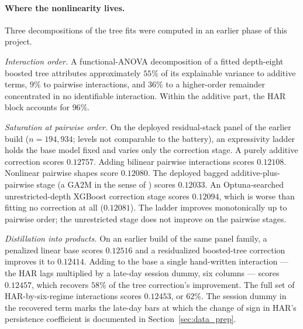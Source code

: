 
\paragraph{Where the nonlinearity lives.} Three decompositions of the tree
fits were computed in an earlier phase of this project.

\emph{Interaction order.} A functional-ANOVA decomposition of a fitted
depth-eight boosted tree attributes approximately $55\%$ of its explainable
variance to additive terms, $9\%$ to pairwise interactions, and $36\%$ to a
higher-order remainder concentrated in no identifiable interaction. Within
the additive part, the HAR block accounts for $96\%$.

\emph{Saturation at pairwise order.} On the deployed residual-stack panel
of the earlier build ($n = 194{,}934$; levels not comparable to the
battery), an expressivity ladder holds the base model fixed and varies only
the correction stage. A purely additive correction scores $0.12757$.
Adding bilinear pairwise interactions scores $0.12108$. Nonlinear pairwise
shapes score $0.12080$. The deployed bagged additive-plus-pairwise stage (a
GA2M in the sense of \citealt{Lou2013}) scores $0.12033$. An
Optuna-searched unrestricted-depth XGBoost correction stage scores
$0.12094$, which is worse than fitting no correction at all ($0.12081$).
The ladder improves monotonically up to pairwise order; the unrestricted
stage does not improve on the pairwise stages.

\emph{Distillation into products.} On an earlier build of the same panel
family, a penalized linear base scores $0.12516$ and a residualized
boosted-tree correction improves it to $0.12414$. Adding to the base a
single hand-written interaction --- the HAR lags multiplied by a late-day
session dummy, six columns --- scores $0.12457$, which recovers $58\%$ of
the tree correction's improvement. The full set of HAR-by-six-regime
interactions scores $0.12453$, or $62\%$. The session dummy in the
recovered term marks the late-day bars at which the change of sign in
HAR's persistence coefficient is documented in
Section~\ref{sec:data_prep}.

